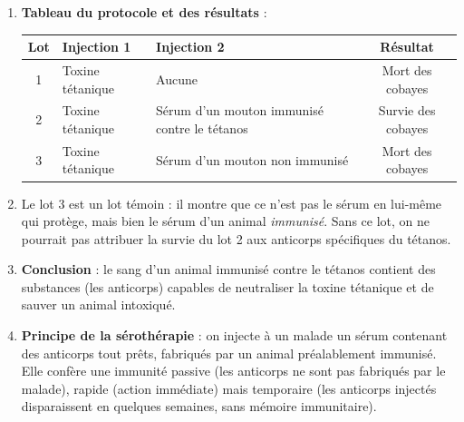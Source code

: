 \documentclass[11pt]{article}
\newcommand{\cle}[1]{{\popxbold\color{popdark}#1}}
\begin{document}
\begin{corrige}
\begin{enumerate}
\item \textbf{Tableau du protocole et des résultats} :
\begin{center}
\begin{tabularx}{\linewidth}{|c|X|X|c|}
\hline
\rowcolor{popblueL} Lot & Injection 1 & Injection 2 & Résultat \\
\hline
1 & Toxine tétanique & Aucune & Mort des cobayes \\
\hline
2 & Toxine tétanique & Sérum d'un mouton immunisé contre le tétanos & Survie des cobayes \\
\hline
3 & Toxine tétanique & Sérum d'un mouton non immunisé & Mort des cobayes \\
\hline
\end{tabularx}
\end{center}
\item Le lot 3 est un \cle{lot témoin} : il montre que ce n'est pas le sérum en lui-même qui protège, mais bien le sérum d'un animal \emph{immunisé}. Sans ce lot, on ne pourrait pas attribuer la survie du lot 2 aux anticorps spécifiques du tétanos.
\item \textbf{Conclusion} : le sang d'un animal immunisé contre le tétanos contient des substances (les \cle{anticorps}) capables de neutraliser la toxine tétanique et de sauver un animal intoxiqué.
\item \textbf{Principe de la sérothérapie} : on injecte à un malade un sérum contenant des anticorps tout prêts, fabriqués par un animal préalablement immunisé. Elle confère une immunité \cle{passive} (les anticorps ne sont pas fabriqués par le malade), \cle{rapide} (action immédiate) mais \cle{temporaire} (les anticorps injectés disparaissent en quelques semaines, sans mémoire immunitaire).
\end{enumerate}
\end{corrige}
\end{document}
